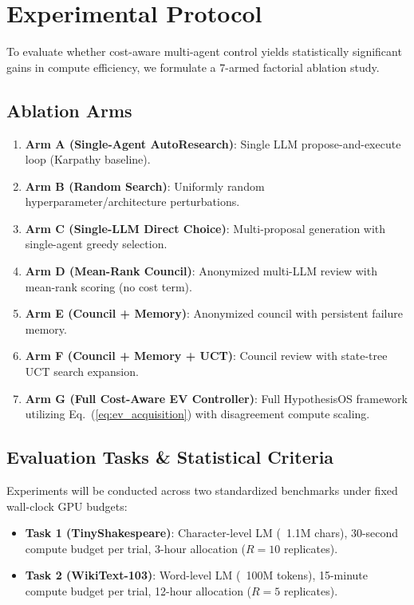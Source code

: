 \documentclass[10pt,twocolumn,3p,times]{article}
\begin{document}
\section{Experimental Protocol}
\label{sec:experiments}

To evaluate whether cost-aware multi-agent control yields statistically significant gains in compute efficiency, we formulate a 7-armed factorial ablation study.

\subsection{Ablation Arms}
\begin{enumerate}
    \item \textbf{Arm A (Single-Agent AutoResearch)}: Single LLM propose-and-execute loop (Karpathy baseline).
    \item \textbf{Arm B (Random Search)}: Uniformly random hyperparameter/architecture perturbations.
    \item \textbf{Arm C (Single-LLM Direct Choice)}: Multi-proposal generation with single-agent greedy selection.
    \item \textbf{Arm D (Mean-Rank Council)}: Anonymized multi-LLM review with mean-rank scoring (no cost term).
    \item \textbf{Arm E (Council + Memory)}: Anonymized council with persistent failure memory.
    \item \textbf{Arm F (Council + Memory + UCT)}: Council review with state-tree UCT search expansion.
    \item \textbf{Arm G (Full Cost-Aware EV Controller)}: Full HypothesisOS framework utilizing Eq.~(\ref{eq:ev_acquisition}) with disagreement compute scaling.
\end{enumerate}

\subsection{Evaluation Tasks \& Statistical Criteria}

Experiments will be conducted across two standardized benchmarks under fixed wall-clock GPU budgets:
\begin{itemize}
    \item \textbf{Task 1 (TinyShakespeare)}: Character-level LM (~1.1M chars), 30-second compute budget per trial, 3-hour allocation ($R=10$ replicates).
    \item \textbf{Task 2 (WikiText-103)}: Word-level LM (~100M tokens), 15-minute compute budget per trial, 12-hour allocation ($R=5$ replicates).
\end{itemize}
\end{document}
